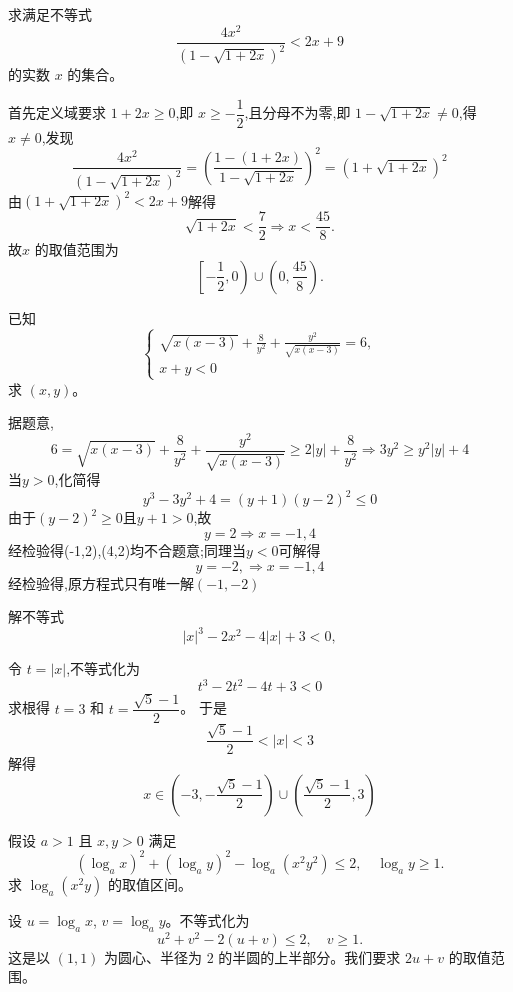 \begin{questions}
    \question 求满足不等式
    \[
    \frac{4x^{2}}{(1-\sqrt{1+2x})^{2}}<2x+9
    \]
    的实数 $x$ 的集合。
    \begin{solution}
        首先定义域要求 $1+2x \ge 0$,即 $x \ge -\dfrac{1}{2}$,且分母不为零,即 $1-\sqrt{1+2x} \ne 0$,得 $x \ne 0$,发现
        \[
        \frac{4x^{2}}{(1-\sqrt{1+2x})^{2}}=\left(\frac{1-(1+2x)}{1-\sqrt{1+2x}}\right)^2= (1+\sqrt{1+2x})^2
        \]
        由$(1+\sqrt{1+2x})^2 < 2x+9$解得
        \[
        \sqrt{1+2x} < \frac{7}{2} \Rightarrow x < \frac{45}{8}.
        \]
        故$x$ 的取值范围为
        \[
        \left[-\frac{1}{2},0\right) \cup \left(0,\frac{45}{8}\right).
        \]
    \end{solution}

    \question 已知
    \[
    \begin{cases}
    \displaystyle \sqrt{x(x-3)} + \frac{8}{y^2} + \frac{y^2}{\sqrt{x(x-3)}} = 6, \\
    x+y < 0
    \end{cases}
    \]
    求 $(x,y)$。
    \begin{solution}
        据题意,
        \[
        6=\sqrt{x(x-3)} + \frac{8}{y^2} + \frac{y^2}{\sqrt{x(x-3)}} \ge 2|y|+\frac{8}{y^2} \Rightarrow 3y^2 \ge y^2|y|+4 \tag{1}
        \]
        当$y>0$,化简得
        \[
        y^3-3y^2+4=(y+1)(y-2)^2\le0
        \]
        由于$(y-2)^2\ge0$且$y+1>0$,故
        \[
        y=2 \Rightarrow x=-1,4
        \]
        经检验得(-1,2),(4,2)均不合题意;同理当$y<0$可解得
        \[
        y=-2,\Rightarrow x=-1,4
        \]
        经检验得,原方程式只有唯一解$(-1,-2)$
    \end{solution}

    \question 解不等式
    \[
    |x|^3 - 2x^2 - 4|x| + 3 < 0,
    \]
    \begin{solution}
        令 \( t = |x| \),不等式化为
        \[
        t^3 - 2t^2 - 4t + 3 < 0
        \]
        求根得 \( t = 3 \) 和 \( t = \dfrac{\sqrt{5}-1}{2}  \)。
        于是
        \[
        \frac{\sqrt{5}-1}{2} < |x| < 3
        \]
        解得
        \[
        x \in \left( -3, -\frac{\sqrt{5}-1}{2} \right) \cup \left( \frac{\sqrt{5}-1}{2}, 3 \right)
        \]
    \end{solution}

    \question 假设 $a>1$ 且 $x,y>0$ 满足
    \[
    (\log_a x)^2 + (\log_a y)^2 - \log_a(x^2y^2) \le 2, \quad \log_a y \ge 1.
    \]
    求 $\log_a(x^2y)$ 的取值区间。
    \begin{solution}
        设 $u = \log_a x$, $v = \log_a y$。不等式化为
        \[
        u^2 + v^2 - 2(u+v) \le 2, \quad v \ge 1.
        \]
        这是以 $(1,1)$ 为圆心、半径为 $2$ 的半圆的上半部分。我们要求 $2u+v$ 的取值范围。


\end{solution}
\end{questions}
